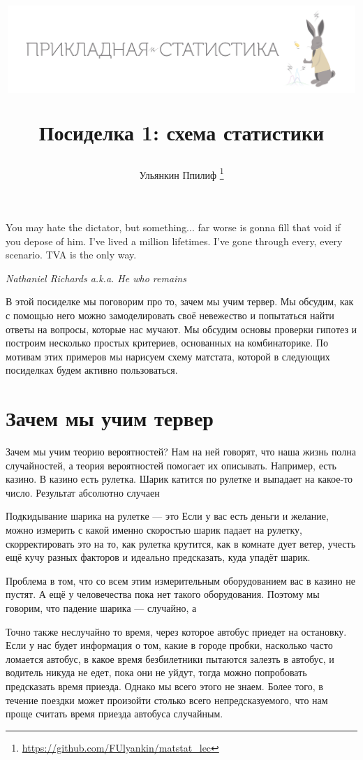 \documentclass[12pt, a4paper, oneside]{article}
\title{
\begin{center} 
\includegraphics[width=0.99\textwidth]{logo.png}
\end{center}

Посиделка 1: схема статистики}
\date{ } %
\author{Ульянкин Ппилиф \thanks{\url{https://github.com/FUlyankin/matstat_lec}}}
\begin{document}

\maketitle

\epigraph{You may hate the dictator, but something... far worse is gonna fill that void if you depose of him. I've lived a million lifetimes. I've gone through every, every scenario. TVA is the only way.}{\textit{Nathaniel Richards a.k.a. He who remains}}


В этой посиделке мы поговорим про то, зачем мы учим тервер. Мы обсудим, как с помощью него можно замоделировать своё невежество и попытаться найти ответы на вопросы, которые нас мучают. Мы обсудим основы проверки гипотез и построим несколько простых критериев, основанных на комбинаторике. По мотивам этих примеров мы нарисуем схему матстата, которой в следующих посиделках будем активно пользоваться. 

\section{Зачем мы учим тервер}

Зачем мы учим теорию вероятностей? Нам на ней говорят, что наша жизнь полна случайностей, а теория вероятностей помогает их описывать. Например, есть казино. В казино есть рулетка. Шарик катится по рулетке и выпадает на какое-то число. Результат абсолютно случаен  

Подкидывание шарика на рулетке --- это  Если у вас есть деньги и желание, можно измерить с какой именно скоростью шарик падает на рулетку, скорректировать это на то, как рулетка крутится, как в комнате дует ветер, учесть ещё кучу разных факторов и идеально предсказать, куда упадёт шарик. 

Проблема в том, что со всем этим измерительным оборудованием вас в казино не пустят. А ещё у человечества пока нет такого оборудования. Поэтому мы говорим, что падение шарика --- случайно, а 

Точно также неслучайно то время, через которое автобус приедет на остановку. Если у нас будет информация о том, какие в городе пробки, насколько часто ломается автобус, в какое время безбилетники пытаются залезть в автобус, и водитель никуда не едет, пока они не уйдут, тогда можно попробовать предсказать время приезда. Однако мы всего этого не знаем. Более того, в течение поездки может произойти столько всего непредсказуемого, что нам проще считать время приезда автобуса случайным. 
\end{document}
